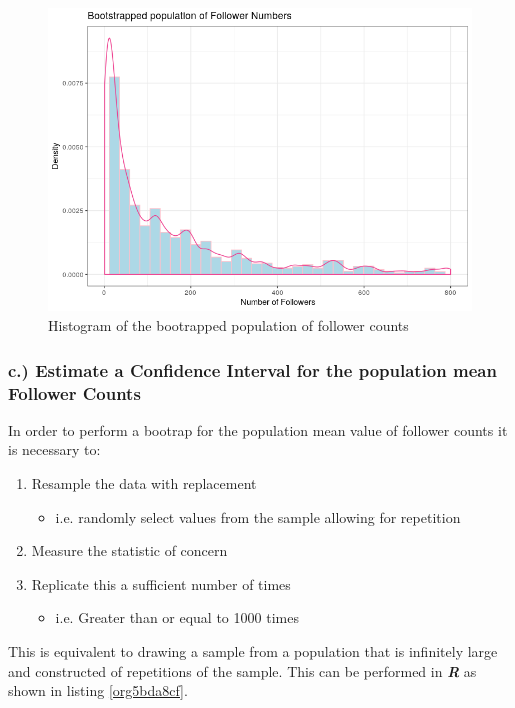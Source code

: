 \documentclass[11pt]{article}
\begin{document}
\begin{figure}[htbp]
\centering
\includegraphics[width=12cm]{./Figures/BootStrap_Pop.png}
\caption{\label{fig:org4392a0a}Histogram of the bootrapped population of follower counts}
\end{figure}

\subsubsection{c.) Estimate a Confidence Interval for the population mean Follower Counts}
\label{sec:org2a883fe}
In order to perform a bootrap for the population mean value of follower counts it is necessary to:

\begin{enumerate}
\item Resample the data with replacement
\begin{itemize}
\item i.e. randomly select values from the sample allowing for repetition
\end{itemize}
\item Measure the statistic of concern
\item Replicate this a sufficient number of times
\begin{itemize}
\item i.e. Greater than or equal to 1000 times \cite[Ch. 5]{davison1997}
\end{itemize}
\end{enumerate}

This is equivalent to drawing a sample from a population that is infinitely large and constructed of repetitions of the sample. This can be performed in \textbf{\emph{R}} as shown in listing \ref{org5bda8cf}.
\end{document}
